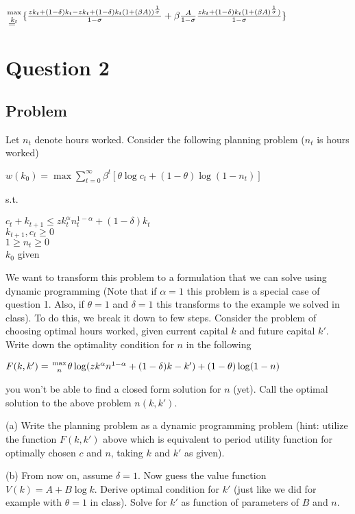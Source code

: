 \documentclass[10pt, a4paper]{article}
\begin{document}
    \begin{center}
      ${\max\atop{k_t}} \{\frac{zk_t+(1-\delta)k_t-zk_t+(1-\delta)k_t(1+(\beta A))^{\frac{1}{\sigma}}}{1-\sigma}+\beta\frac{A}{1-\sigma}\frac{zk_t+(1-\delta)k_t(1+(\beta A)^{\frac{1}{\sigma}})}{1-\sigma}\}$ \\ 
      $ =  $
\section{Question 2}
  \subsection*{Problem}
    Let $n_t$ denote hours worked. Consider the following planning problem ($n_t$ is hours worked)
    \begin{center}
      $w(k_0) = \max\sum_{t=0}^{\infty}\beta^t[\theta\log c_t+(1-\theta)\log(1-n_t)]$
    \end{center}
    s.t.
    \begin{center}
      $c_t+k_{t+1}\leq zk_t^{\alpha}n_t^{1-\alpha}+(1-\delta)k_t$ \\
      $k_{t+1},c_t\geq 0$ \\
      $1\geq n_t\geq 0$ \\
      $k_0$ given
    \end{center}

    We want to transform this problem to a formulation that we can solve using dynamic programming (Note that if $\alpha=1$ this problem is a special case of question 1. Also, if $\theta=1$ and $\delta=1$ this transforms to the example we solved in class). To do this, we break it down to few steps. Consider the problem of choosing optimal hours worked, given current capital $k$ and future capital $k'$. Write down the optimality condition for $n$ in the following
    \begin{center}
      $F(k,k')={\max\atop{n}}\theta\log(zk^{\alpha}n^{1-\alpha}+(1-\delta)k-k')+(1-\theta)\log(1-n)$
    \end{center}
    you won't be able to find a closed form solution for $n$ (yet). Call the optimal solution to the above problem $n(k,k')$.

    (a) Write the planning problem as a dynamic programming problem (hint: utilize the function $F(k,k')$ above which is equivalent to period utility function for optimally chosen $c$ and $n$, taking $k$ and $k'$ as given).

    (b) From now on, assume $\delta=1$. Now guess the value function $V(k)=A+B\log k$. Derive optimal condition for $k'$ (just like we did for example with $\theta=1$ in class). Solve for $k'$ as function of parameters of $B$ and $n$.


\end{center}
\end{document}
